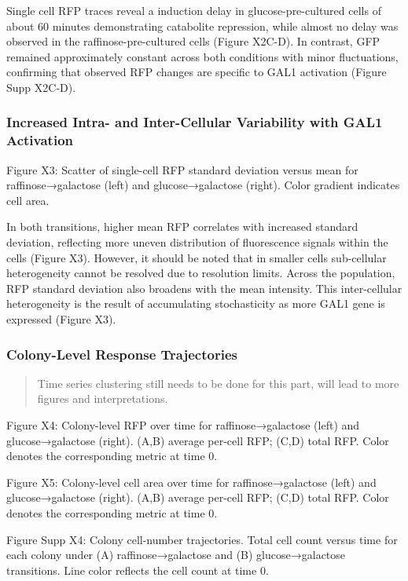 Single cell RFP traces reveal a induction delay in glucose-pre-cultured
cells of about 60 minutes demonstrating catabolite repression, while
almost no delay was observed in the raffinose-pre-cultured cells (Figure
X2C-D). In contrast, GFP remained approximately constant across both
conditions with minor fluctuations, confirming that observed RFP changes
are specific to GAL1 activation (Figure Supp X2C-D).

\subsubsection{Increased Intra- and Inter-Cellular Variability with GAL1
Activation}\label{increased-intra--and-inter-cellular-variability-with-gal1-activation}

Figure X3: Scatter of single-cell RFP standard deviation versus mean for
raffinose→galactose (left) and glucose→galactose (right). Color gradient
indicates cell area.

In both transitions, higher mean RFP correlates with increased standard
deviation, reflecting more uneven distribution of fluorescence signals
within the cells (Figure X3). However, it should be noted that in
smaller cells sub-cellular heterogeneity cannot be resolved due to
resolution limits. Across the population, RFP standard deviation also
broadens with the mean intensity. This inter-cellular heterogeneity is
the result of accumulating stochasticity as more GAL1 gene is expressed
(Figure X3).

\subsubsection{Colony-Level Response
Trajectories}\label{colony-level-response-trajectories}

\begin{quote}
Time series clustering still needs to be done for this part, will lead
to more figures and interpretations.
\end{quote}

Figure X4: Colony-level RFP over time for raffinose→galactose (left) and
glucose→galactose (right). (A,B) average per-cell RFP; (C,D) total RFP.
Color denotes the corresponding metric at time 0.

Figure X5: Colony-level cell area over time for raffinose→galactose
(left) and glucose→galactose (right). (A,B) average per-cell RFP; (C,D)
total RFP. Color denotes the corresponding metric at time 0.

Figure Supp X4: Colony cell-number trajectories. Total cell count versus
time for each colony under (A) raffinose→galactose and (B)
glucose→galactose transitions. Line color reflects the cell count at
time 0.

